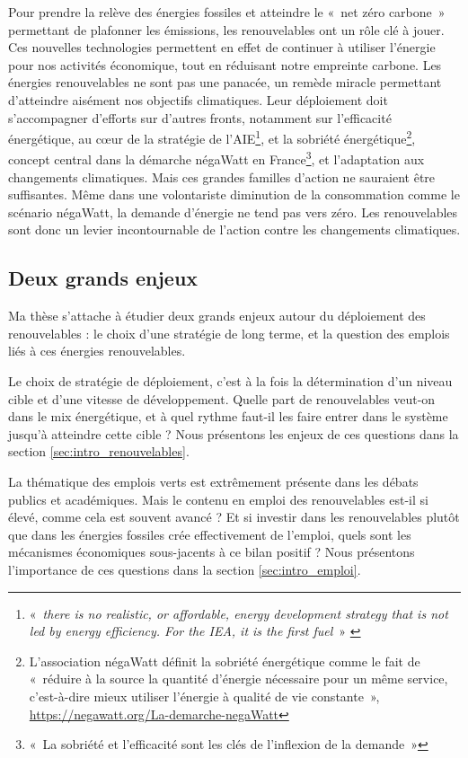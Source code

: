 Pour prendre la relève des énergies fossiles et atteindre le «~net zéro carbone~» permettant de plafonner les émissions, les renouvelables ont un rôle clé à jouer. Ces nouvelles technologies permettent en effet de continuer à utiliser l’énergie pour nos activités économique, tout en réduisant notre empreinte carbone.
Les énergies renouvelables ne sont pas une panacée, un remède miracle permettant d’atteindre aisément nos objectifs climatiques. Leur déploiement doit s’accompagner d’efforts sur d’autres fronts, notamment sur l’efficacité énergétique, au cœur de la stratégie de l’AIE\footnote{« \textit{there is no realistic, or affordable, energy development strategy that is not led by energy efficiency. For the IEA, it is the first fuel}~» \citep{IEA2016Efficiency}},
et la sobriété énergétique\footnote{L'association négaWatt définit la sobriété énergétique comme le fait de «~réduire à la source la quantité d’énergie nécessaire pour un même service, c’est-à-dire mieux utiliser l’énergie à qualité de vie constante~», \url{https://negawatt.org/La-demarche-negaWatt}}, concept central dans la démarche négaWatt en France\footnote{«~La sobriété et l’efficacité sont les clés de l’inflexion de la demande~»\citep{NegaWatt2017}}, et l'adaptation aux changements climatiques.
Mais ces grandes familles d’action ne sauraient être suffisantes. Même dans une volontariste diminution de la consommation comme le scénario négaWatt, la demande d’énergie ne tend pas vers zéro. Les renouvelables sont donc un levier incontournable de l’action contre les changements climatiques.


\subsection{Deux grands enjeux}
Ma thèse s’attache à étudier deux grands enjeux autour du déploiement des renouvelables : le choix d’une stratégie de long terme, et la question des emplois liés à ces énergies renouvelables.

Le choix de stratégie de déploiement, c’est à la fois la détermination d’un niveau cible et d’une vitesse de développement. Quelle part de renouvelables veut-on dans le mix énergétique, et à quel rythme faut-il les faire entrer dans le système jusqu’à atteindre cette cible ? 
Nous présentons les enjeux de ces questions dans la section \ref{sec:intro_renouvelables}.

La thématique des emplois verts est extrêmement présente dans les débats publics et académiques. Mais le contenu en emploi des renouvelables est-il si élevé, comme cela est souvent avancé ? Et si investir dans les renouvelables plutôt que dans les énergies fossiles crée effectivement de l’emploi, quels sont les mécanismes économiques sous-jacents à ce bilan positif ? Nous présentons l’importance de ces questions dans la section \ref{sec:intro_emploi}.



